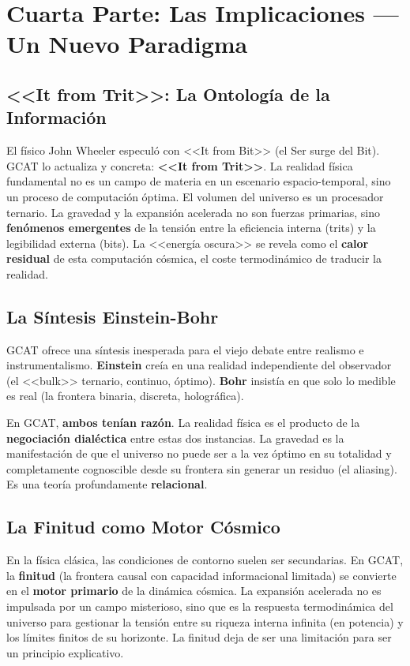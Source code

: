 \documentclass[12pt, a4paper]{article}
\begin{document}
\section{Cuarta Parte: Las Implicaciones — Un Nuevo Paradigma}

\subsection{<<It from Trit>>: La Ontología de la Información}

El físico John Wheeler especuló con <<It from Bit>> (el Ser surge del Bit). GCAT lo actualiza y concreta: \textbf{<<It from Trit>>}. La realidad física fundamental no es un campo de materia en un escenario espacio-temporal, sino un proceso de computación óptima. El volumen del universo es un procesador ternario. La gravedad y la expansión acelerada no son fuerzas primarias, sino \textbf{fenómenos emergentes} de la tensión entre la eficiencia interna (trits) y la legibilidad externa (bits). La <<energía oscura>> se revela como el \textbf{calor residual} de esta computación cósmica, el coste termodinámico de traducir la realidad.

\subsection{La Síntesis Einstein-Bohr}

GCAT ofrece una síntesis inesperada para el viejo debate entre realismo e instrumentalismo. \textbf{Einstein} creía en una realidad independiente del observador (el <<bulk>> ternario, continuo, óptimo). \textbf{Bohr} insistía en que solo lo medible es real (la frontera binaria, discreta, holográfica).

En GCAT, \textbf{ambos tenían razón}. La realidad física es el producto de la \textbf{negociación dialéctica} entre estas dos instancias. La gravedad es la manifestación de que el universo no puede ser a la vez óptimo en su totalidad y completamente cognoscible desde su frontera sin generar un residuo (el aliasing). Es una teoría profundamente \textbf{relacional}.

\subsection{La Finitud como Motor Cósmico}

En la física clásica, las condiciones de contorno suelen ser secundarias. En GCAT, la \textbf{finitud} (la frontera causal con capacidad informacional limitada) se convierte en el \textbf{motor primario} de la dinámica cósmica. La expansión acelerada no es impulsada por un campo misterioso, sino que es la respuesta termodinámica del universo para gestionar la tensión entre su riqueza interna infinita (en potencia) y los límites finitos de su horizonte. La finitud deja de ser una limitación para ser un principio explicativo.
\end{document}
